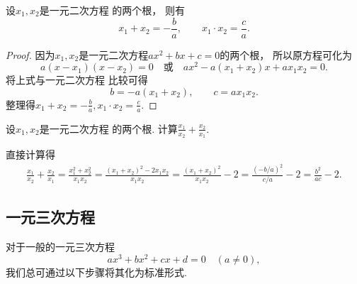 \begin{theorem}[韦达定理]\label{theorem:一元二次方程.韦达定理}
设\(x_1,x_2\)是一元二次方程  的两个根，
则有\begin{equation*}
	x_1 + x_2 = -\frac{b}{a},
	\qquad
	x_1 \cdot x_2 = \frac{c}{a}.
\end{equation*}
\begin{proof}
因为\(x_1,x_2\)是一元二次方程\(ax^2 + bx + c = 0\)的两个根，
所以原方程可化为\begin{equation*}
	a(x - x_1)(x - x_2) = 0
	\quad\text{或}\quad
	a x^2 - a (x_1 + x_2) x + a x_1 x_2 = 0.
\end{equation*}
将上式与一元二次方程  比较可得\begin{equation*}
	b = -a (x_1 + x_2),
	\qquad
	c = a x_1 x_2.
\end{equation*}
整理得\(x_1 + x_2 = -\frac{b}{a}, x_1 \cdot x_2 = \frac{c}{a}\).
\end{proof}
\end{theorem}

\begin{example}
设\(x_1,x_2\)是一元二次方程  的两个根.
计算\(\frac{x_1}{x_2} + \frac{x_2}{x_1}\).
\begin{solution}
直接计算得\begin{align*}
	\frac{x_1}{x_2} + \frac{x_2}{x_1}
	= \frac{x_1^2+x_2^2}{x_1 x_2}
	= \frac{(x_1+x_2)^2 - 2 x_1 x_2}{x_1 x_2}
	= \frac{(x_1+x_2)^2}{x_1 x_2} - 2
	= \frac{(-b/a)^2}{c/a} - 2
	= \frac{b^2}{a c} - 2.
\end{align*}
\end{solution}
\end{example}

\subsection{一元三次方程}
对于一般的一元三次方程\begin{equation}\label{equation:一元三次方程.一元三次方程的一般形式}
	ax^3+bx^2+cx+d=0 \quad(a\neq0),
\end{equation}
我们总可通过以下步骤将其化为标准形式.


